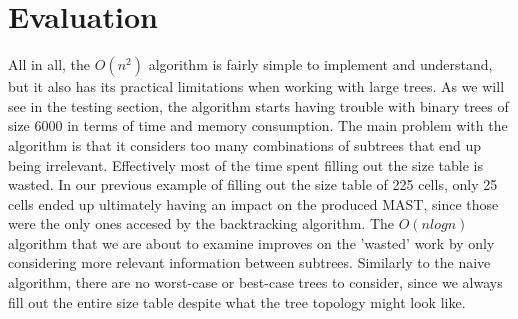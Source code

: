 \section{Evaluation}
All in all, the $O(n^2)$ algorithm is fairly simple to implement and understand, but it also has its practical limitations when working with large trees. As we will see in the testing section, the algorithm starts having trouble with binary trees of size 6000 in terms of time and memory consumption. The main problem with the algorithm is that it considers too many combinations of subtrees that end up being irrelevant. Effectively most of the time spent filling out the size table is wasted. In our previous example of filling out the size table of 225 cells, only 25 cells ended up ultimately having an impact on the produced MAST, since those were the only ones accesed by the backtracking algorithm. The $O(nlogn)$ algorithm that we are about to examine improves on the 'wasted' work by only considering more relevant information between subtrees.
Similarly to the naive algorithm, there are no worst-case or best-case trees to consider, since we always fill out the entire size table despite what the tree topology might look like. 
